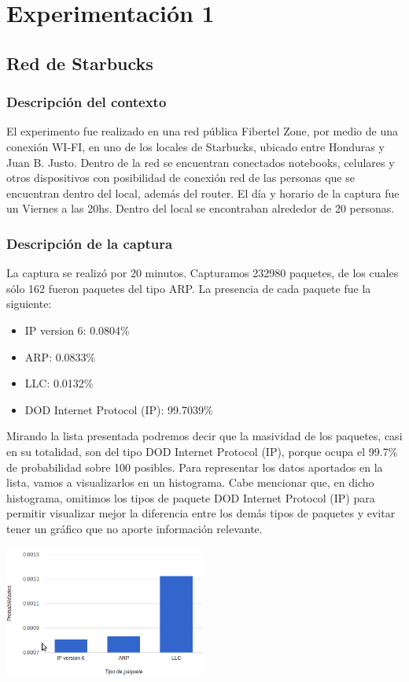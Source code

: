 \section{Experimentaci\'on 1}

\subsection{Red de Starbucks}

\subsubsection{Descripci\'on del contexto}
El experimento fue realizado en una red p\'ublica Fibertel Zone, por medio de una conexión WI-FI, en uno de los locales de Starbucks, ubicado entre Honduras y Juan B. Justo. Dentro de la red se encuentran conectados notebooks, celulares y otros dispositivos con posibilidad de conexi\'on red de las personas que se encuentran dentro del local, adem\'as del router. El día y horario de la captura fue un Viernes a las 20hs. Dentro del local se encontraban alrededor de 20 personas.

\subsubsection{Descripci\'on de la captura}
La captura se realiz\'o por 20 minutos. Capturamos 232980 paquetes, de los cuales s\'olo 162 fueron paquetes del tipo ARP. La presencia de cada paquete fue la siguiente:
\begin{itemize}
\item IP version 6: 0.0804\%
\item ARP: 0.0833\%
\item LLC: 0.0132\%
\item DOD Internet Protocol (IP): 99.7039\%
\end{itemize}
Mirando la lista presentada podremos decir que la masividad de los paquetes, casi en su totalidad, son del tipo DOD Internet Protocol (IP), porque ocupa el 99.7\% de probabilidad sobre 100 posibles. Para representar los datos aportados en la lista, vamos a visualizarlos en un histograma. Cabe mencionar que, en dicho histograma, omitimos los tipos de paquete DOD Internet Protocol (IP) para permitir visualizar mejor la diferencia entre los dem\'as tipos de paquetes y evitar tener un gr\'afico que no aporte informaci\'on relevante.

\begin{center}
\includegraphics[width=0.5\textwidth]{exp1-graficos/grafico1exp1.png}
\end{center}

